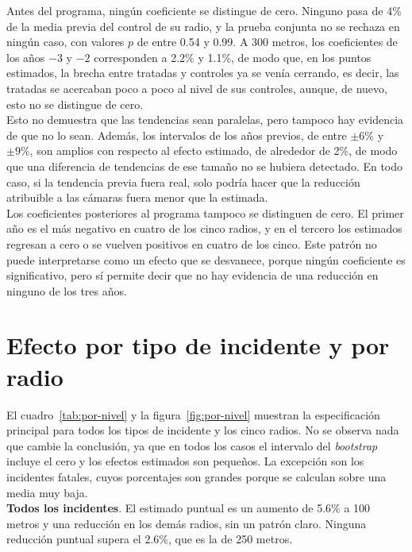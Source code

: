 Antes del programa, ningún coeficiente se distingue de cero. Ninguno pasa de 4\% de la media previa del control de su radio, y la prueba conjunta no se rechaza en ningún caso, con valores $p$ de entre 0.54 y 0.99. A 300 metros, los coeficientes de los años $-3$ y $-2$ corresponden a 2.2\% y 1.1\%, de modo que, en los puntos estimados, la brecha entre tratadas y controles ya se venía cerrando, es decir, las tratadas se acercaban poco a poco al nivel de sus controles, aunque, de nuevo, esto no se distingue de cero.\\

Esto no demuestra que las tendencias sean paralelas, pero tampoco hay evidencia de que no lo sean. Además, los intervalos de los años previos, de entre $\pm 6\%$ y $\pm 9\%$, son amplios con respecto al efecto estimado, de alrededor de 2\%, de modo que una diferencia de tendencias de ese tamaño no se hubiera detectado. En todo caso, si la tendencia previa fuera real, solo podría hacer que la reducción atribuible a las cámaras fuera menor que la estimada.\\

Los coeficientes posteriores al programa tampoco se distinguen de cero. El primer año es el más negativo en cuatro de los cinco radios, y en el tercero los estimados regresan a cero o se vuelven positivos en cuatro de los cinco. Este patrón no puede interpretarse como un efecto que se desvanece, porque ningún coeficiente es significativo, pero sí permite decir que no hay evidencia de una reducción en ninguno de los tres años.

\section{Efecto por tipo de incidente y por radio}
\label{sec:por-severidad}

\noindent El cuadro~\ref{tab:por-nivel} y la figura~\ref{fig:por-nivel} muestran la especificación principal para todos los tipos de incidente y los cinco radios. No se observa nada que cambie la conclusión, ya que en todos los casos el intervalo del \emph{bootstrap} incluye el cero y los efectos estimados son pequeños. La excepción son los incidentes fatales, cuyos porcentajes son grandes porque se calculan sobre una media muy baja.\\

\textbf{Todos los incidentes}. El estimado puntual es un aumento de 5.6\% a 100 metros y una reducción en los demás radios, sin un patrón claro. Ninguna reducción puntual supera el 2.6\%, que es la de 250 metros.\\

